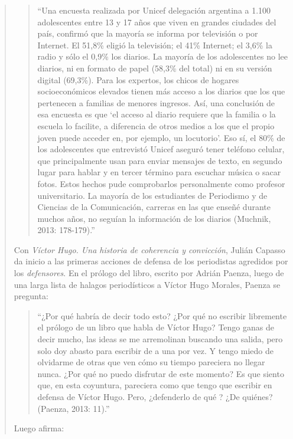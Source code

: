 \begin{quote}
\begin{quote}
	\enquote{Una encuesta realizada por Unicef delegación argentina a 1.100 adolescentes entre 13 y 17 años que viven en grandes ciudades del país, confirmó que la mayoría se informa por televisión o por Internet. El 51,8\% eligió la televisión; el 41\% Internet; el 3,6\% la radio y sólo el 0,9\% los diarios. La mayoría de los adolescentes no lee diarios, ni en formato de papel (58,3\% del total) ni en su versión digital (69,3\%). Para los expertos, los chicos de hogares socioeconómicos elevados tienen más acceso a los diarios que los que pertenecen a familias de menores ingresos. Así, una conclusión de esa encuesta es que \enquote{el acceso al diario requiere que la familia o la escuela lo facilite, a diferencia de otros medios  a los que el propio joven puede acceder en, por ejemplo, un locutorio}. Eso sí, el 80\% de los adolescentes que entrevistó Unicef aseguró tener teléfono celular, que principalmente usan para enviar mensajes de texto, en segundo lugar para hablar y en tercer término para escuchar música o sacar fotos. Estos hechos pude comprobarlos personalmente como profesor universitario. La mayoría de los estudiantes de Periodismo y de Ciencias de la Comunicación, carreras en las que enseñé durante muchos años, no seguían la información de los diarios (Muchnik, 2013: 178-179).}
\end{quote}


Con \emph{Víctor Hugo. Una historia de coherencia y convicción}, Julián Capasso da inicio a las primeras acciones de defensa de los periodistas agredidos por los \emph{defensores}. En el prólogo del libro, escrito por Adrián Paenza, luego de una larga lista de halagos periodísticos a Víctor Hugo Morales, Paenza se pregunta:

\begin{quote}
	\enquote{¿Por qué habría de decir todo esto? ¿Por qué no escribir libremente el prólogo de un libro que habla de Víctor Hugo? Tengo ganas de decir mucho, las ideas se me arremolinan buscando una salida, pero solo doy abasto para escribir de a una por vez. Y tengo miedo de olvidarme de otras que ven cómo su tiempo pareciera no llegar nunca. ¿Por qué no puedo disfrutar de este momento? Es que siento que, en esta coyuntura, pareciera como que tengo que escribir en defensa de Víctor Hugo. Pero, ¿defenderlo de qué ? ¿De quiénes? (Paenza, 2013: 11).}
\end{quote}


Luego afirma:


\end{quote}
